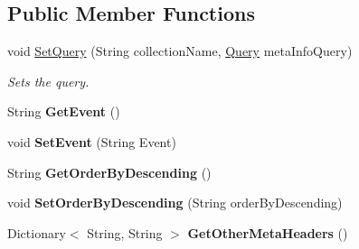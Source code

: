 \subsection*{Public Member Functions}
\begin{DoxyCompactItemize}
\item 
void \hyperlink{classcom_1_1shephertz_1_1app42_1_1paas_1_1sdk_1_1csharp_1_1_app42_service_aaee243a1a89a5000f84dfb636534191e}{Set\+Query} (String collection\+Name, \hyperlink{classcom_1_1shephertz_1_1app42_1_1paas_1_1sdk_1_1csharp_1_1storage_1_1_query}{Query} meta\+Info\+Query)
\begin{DoxyCompactList}\small\item\em Sets the query. \end{DoxyCompactList}\item 
\hypertarget{classcom_1_1shephertz_1_1app42_1_1paas_1_1sdk_1_1csharp_1_1_app42_service_a0bcc0a7d61995c5f76aadda952c169a5}{String {\bfseries Get\+Event} ()}\label{classcom_1_1shephertz_1_1app42_1_1paas_1_1sdk_1_1csharp_1_1_app42_service_a0bcc0a7d61995c5f76aadda952c169a5}

\item 
\hypertarget{classcom_1_1shephertz_1_1app42_1_1paas_1_1sdk_1_1csharp_1_1_app42_service_a5b408ff2e041e8f399072ec4dc2de77d}{void {\bfseries Set\+Event} (String Event)}\label{classcom_1_1shephertz_1_1app42_1_1paas_1_1sdk_1_1csharp_1_1_app42_service_a5b408ff2e041e8f399072ec4dc2de77d}

\item 
\hypertarget{classcom_1_1shephertz_1_1app42_1_1paas_1_1sdk_1_1csharp_1_1_app42_service_a0bfc688a598853ca6c5d2bb25f54afff}{String {\bfseries Get\+Order\+By\+Descending} ()}\label{classcom_1_1shephertz_1_1app42_1_1paas_1_1sdk_1_1csharp_1_1_app42_service_a0bfc688a598853ca6c5d2bb25f54afff}

\item 
\hypertarget{classcom_1_1shephertz_1_1app42_1_1paas_1_1sdk_1_1csharp_1_1_app42_service_a2a37922e42f68072ea598ed30b8221c0}{void {\bfseries Set\+Order\+By\+Descending} (String order\+By\+Descending)}\label{classcom_1_1shephertz_1_1app42_1_1paas_1_1sdk_1_1csharp_1_1_app42_service_a2a37922e42f68072ea598ed30b8221c0}

\item 
\hypertarget{classcom_1_1shephertz_1_1app42_1_1paas_1_1sdk_1_1csharp_1_1_app42_service_add1b87766546516fa806e78e249dbfb8}{Dictionary$<$ String, String $>$ {\bfseries Get\+Other\+Meta\+Headers} ()}\label{classcom_1_1shephertz_1_1app42_1_1paas_1_1sdk_1_1csharp_1_1_app42_service_add1b87766546516fa806e78e249dbfb8}


\end{DoxyCompactItemize}
